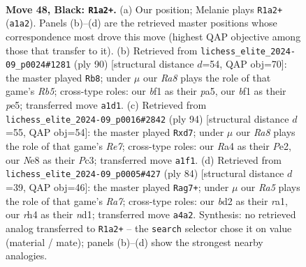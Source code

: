 \documentclass[11pt]{article}
\begin{document}
\clearpage

\begin{figure}[p]\centering
\begin{subfigure}{0.46\textwidth}\centering
\resizebox{\linewidth}{!}{%
\newchessgame
\chessboard[
  setfen={4n3/p1p5/2k5/5p2/r4P1R/8/1K1B3P/r4BR1 b - - 1 48},
  showmover=false,
  pgfstyle=straightmove, color=movearrow, markmove={a1-a2}
]}
\caption{}
\end{subfigure}\hfill
\begin{subfigure}{0.46\textwidth}\centering
\resizebox{\linewidth}{!}{%
\newchessgame
\chessboard[
  setfen={8/8/2k5/pR2pr2/r5p1/6P1/1R3PK1/8 w - - 2 46},
  showmover=false,
  pgfstyle=straightmove, color=movearrow, markmove={b5-b8}
]}
\caption{}
\end{subfigure}
\\[4pt]
\begin{subfigure}{0.46\textwidth}\centering
\resizebox{\linewidth}{!}{%
\newchessgame
\chessboard[
  setfen={5r2/pr1bR1R1/2p2k2/2p2p1B/5K2/P1P5/4P3/8 w - - 6 48},
  showmover=false,
  pgfstyle=straightmove, color=movearrow, markmove={e7-d7}
]}
\caption{}
\end{subfigure}\hfill
\begin{subfigure}{0.46\textwidth}\centering
\resizebox{\linewidth}{!}{%
\newchessgame
\chessboard[
  setfen={6k1/R6R/5r1p/4N3/8/p3P1KP/6P1/r2n4 w - - 3 43},
  showmover=false,
  pgfstyle=straightmove, color=movearrow, markmove={a7-g7}
]}
\caption{}
\end{subfigure}
\caption{\textbf{Move 48, Black: \texttt{R1a2+}.} (a) Our position; Melanie plays \texttt{R1a2+} (\texttt{a1a2}). Panels (b)--(d) are the retrieved master positions whose correspondence most drove this move (highest QAP objective among those that transfer to it). (b) Retrieved from \texttt{lichess\_elite\_2024-09\_p0024\#1281} (ply 90) [structural distance $d$=54, QAP obj=70]: the master played \texttt{Rb8}; under $\mu$ our \emph{Ra8} plays the role of that game's \emph{Rb5}; cross-type roles: our \emph{b}f1 as their \emph{p}a5, our \emph{b}f1 as their \emph{p}e5; transferred move \texttt{a1d1}. (c) Retrieved from \texttt{lichess\_elite\_2024-09\_p0016\#2842} (ply 94) [structural distance $d$=55, QAP obj=54]: the master played \texttt{Rxd7}; under $\mu$ our \emph{Ra8} plays the role of that game's \emph{Re7}; cross-type roles: our \emph{R}a4 as their \emph{P}e2, our \emph{N}e8 as their \emph{P}c3; transferred move \texttt{a1f1}. (d) Retrieved from \texttt{lichess\_elite\_2024-09\_p0005\#427} (ply 84) [structural distance $d$=39, QAP obj=46]: the master played \texttt{Rag7+}; under $\mu$ our \emph{Ra5} plays the role of that game's \emph{Ra7}; cross-type roles: our \emph{b}d2 as their \emph{r}a1, our \emph{r}h4 as their \emph{n}d1; transferred move \texttt{a4a2}. Synthesis: no retrieved analog transferred to \texttt{R1a2+} -- the \texttt{search} selector chose it on value (material / mate); panels (b)--(d) show the strongest nearby analogies.}
\label{fig:thought-m95}
\end{figure}
\end{document}
